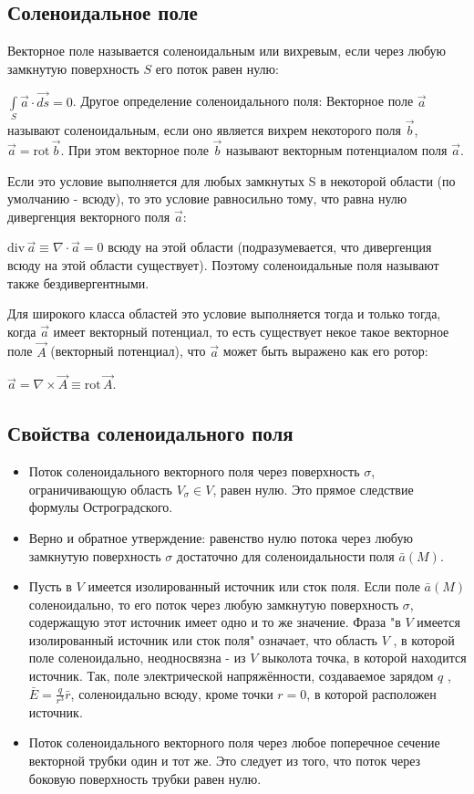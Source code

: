 \subsection{Соленоидальное поле}

Векторное поле называется соленоидальным или вихревым, если через любую замкнутую поверхность $S$ его поток равен нулю:

$\int\limits_S \vec a \cdot \vec{ds} = 0$.
Другое определение соленоидального поля: Векторное поле $\vec {a}$ называют соленоидальным, если оно является вихрем некоторого поля $\vec  {b}$, $\vec {a}=\mathrm {rot} \,{\vec {b}}$. При этом векторное поле $\vec  {b}$ называют векторным потенциалом поля $\vec {a}$.

Если это условие выполняется для любых замкнутых S в некоторой области (по умолчанию - всюду), то это условие равносильно тому, что равна нулю дивергенция векторного поля $\vec a$:

$\mathrm {div} \,{\vec {a}}\equiv \nabla \cdot {\vec {a}}=0$
всюду на этой области (подразумевается, что дивергенция всюду на этой области существует). Поэтому соленоидальные поля называют также бездивергентными.

Для широкого класса областей это условие выполняется тогда и только тогда, когда $\vec a$ имеет векторный потенциал, то есть существует некое такое векторное поле $\vec  A$ (векторный потенциал), что $\vec a$ может быть выражено как его ротор:

$\vec {a}=\nabla \times {\vec {A}}\equiv \mathrm {rot} \,{\vec {A}}$.

\subsection{Свойства соленоидального поля}

\begin{itemize}
\item Поток соленоидального векторного поля через поверхность $\sigma$, ограничивающую область $V_{\sigma} \in V$, равен нулю. Это прямое следствие формулы Остроградского.
\item Верно и обратное утверждение: равенство нулю потока через любую замкнутую поверхность $\sigma$ достаточно для соленоидальности поля $\bar a(M)$.

\item Пусть в  $V$  имеется изолированный источник или сток поля. Если поле $\bar a(M)$ соленоидально, то его поток через любую замкнутую поверхность $\sigma$, содержащую этот источник имеет одно и то же значение. Фраза "в  $V$  имеется изолированный источник или сток поля" означает, что область  $V$ , в которой поле соленоидально, неодносвязна - из $V$  выколота точка, в которой находится источник. Так, поле электрической напряжённости, создаваемое зарядом  $q$ ,$\bar E=\frac{q}{r^3}\bar r$, соленоидально всюду, кроме точки $r=0$, в которой расположен источник.
\item Поток соленоидального векторного поля через любое поперечное сечение векторной трубки один и тот же. Это следует из того, что поток через боковую поверхность трубки равен нулю.
\end{itemize}

